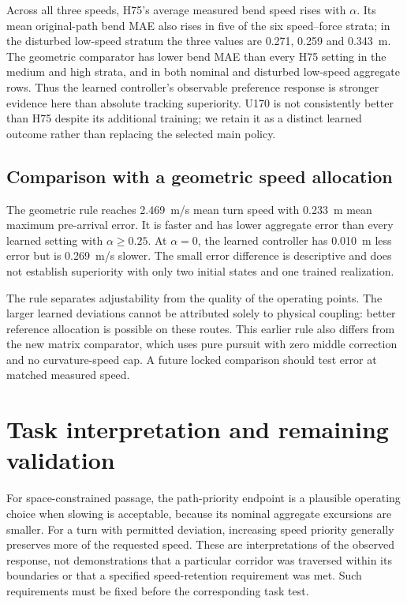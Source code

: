 \documentclass[final,5p,times,twocolumn]{elsarticle}
\begin{document}
Across all three speeds, H75's average measured bend speed rises with $\alpha$. Its mean original-path bend MAE also rises in five of the six speed--force strata; in the disturbed low-speed stratum the three values are 0.271, 0.259 and 0.343~m. The geometric comparator has lower bend MAE than every H75 setting in the medium and high strata, and in both nominal and disturbed low-speed aggregate rows. Thus the learned controller's observable preference response is stronger evidence here than absolute tracking superiority. U170 is not consistently better than H75 despite its additional training; we retain it as a distinct learned outcome rather than replacing the selected main policy.



\subsection{Comparison with a geometric speed allocation}
The geometric rule reaches 2.469~m/s mean turn speed with 0.233~m mean maximum pre-arrival error. It is faster and has lower aggregate error than every learned setting with $\alpha\ge0.25$. At $\alpha=0$, the learned controller has 0.010~m less error but is 0.269~m/s slower. The small error difference is descriptive and does not establish superiority with only two initial states and one trained realization.

The rule separates adjustability from the quality of the operating points. The larger learned deviations cannot be attributed solely to physical coupling: better reference allocation is possible on these routes. This earlier rule also differs from the new matrix comparator, which uses pure pursuit with zero middle correction and no curvature-speed cap. A future locked comparison should test error at matched measured speed.

\section{Task interpretation and remaining validation}
For space-constrained passage, the path-priority endpoint is a plausible operating choice when slowing is acceptable, because its nominal aggregate excursions are smaller. For a turn with permitted deviation, increasing speed priority generally preserves more of the requested speed. These are interpretations of the observed response, not demonstrations that a particular corridor was traversed within its boundaries or that a specified speed-retention requirement was met. Such requirements must be fixed before the corresponding task test.
\end{document}

